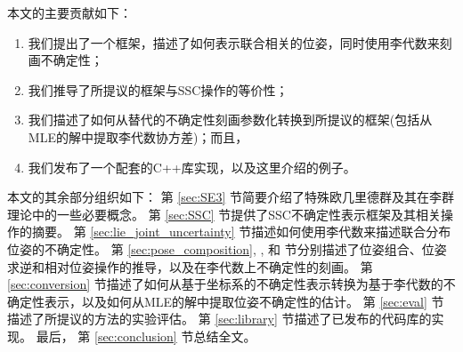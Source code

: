 本文的主要贡献如下：
\begin{enumerate}
    \item 我们提出了一个框架，描述了如何表示联合相关的位姿，同时使用李代数来刻画不确定性；
    \item 我们推导了所提议的框架与SSC操作的等价性；
    \item 我们描述了如何从替代的不确定性刻画参数化转换到所提议的框架(包括从MLE的解中提取李代数协方差)；而且， 
    \item 我们发布了一个配套的C++库实现，以及这里介绍的例子。
\end{enumerate}
本文的其余部分组织如下：
第 \ref{sec:SE3} 节简要介绍了特殊欧几里德群及其在李群理论中的一些必要概念。 
第 \ref{sec:SSC} 节提供了SSC不确定性表示框架及其相关操作的摘要。 
第 \ref{sec:lie_joint_uncertainty} 节描述如何使用李代数来描述联合分布位姿的不确定性。 
第 \ref{sec:pose_composition}, , 和  节分别描述了位姿组合、位姿求逆和相对位姿操作的推导，以及在李代数上不确定性的刻画。
第 \ref{sec:conversion} 节描述了如何从基于坐标系的不确定性表示转换为基于李代数的不确定性表示，以及如何从MLE的解中提取位姿不确定性的估计。
第 \ref{sec:eval} 节描述了所提议的方法的实验评估。
第 \ref{sec:library} 节描述了已发布的代码库的实现。 
最后， 第 \ref{sec:conclusion} 节总结全文。 
